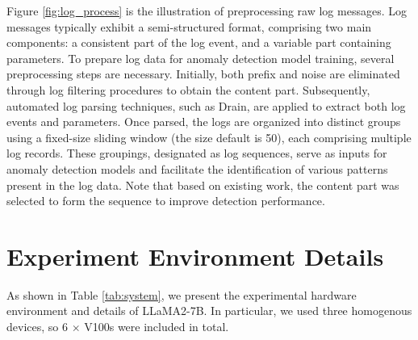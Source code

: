 Figure \ref{fig:log_process} is the illustration of preprocessing raw log messages. Log messages typically exhibit a semi-structured format, comprising two main components: a consistent part of the log event, and a variable part containing parameters. To prepare log data for anomaly detection model training, several preprocessing steps are necessary. Initially, both prefix and noise are eliminated through log filtering procedures to obtain the content part. Subsequently, automated log parsing techniques, such as Drain, are applied to extract both log events and parameters. Once parsed, the logs are organized into distinct groups using a fixed-size sliding window (the size default is 50), each comprising multiple log records. These groupings, designated as log sequences, serve as inputs for anomaly detection models and facilitate the identification of various patterns present in the log data. Note that based on existing work, the content part was selected to form the sequence to improve detection performance.

\section{Experiment Environment Details}
As shown in Table \ref{tab:system}, we present the experimental hardware environment and details of LLaMA2-7B. In particular, we used three homogenous devices, so 6 $\times$ V100s were included in total.

